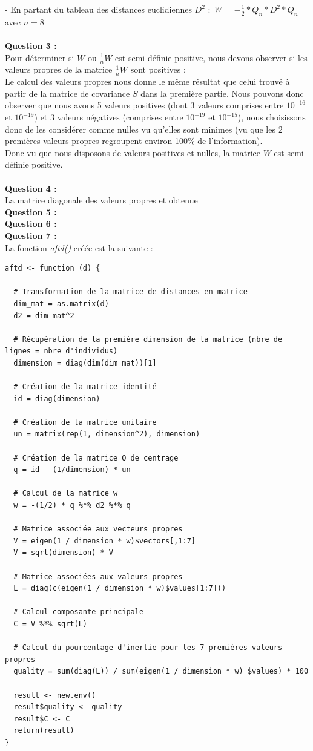 \documentclass[a4paper, 10pt]{article}
\begin{document}
- En partant du tableau des distances euclidiennes \textit{$D^{2}$} : \textit{W = $-\frac{1}{2} * Q_{n} * D^{2} * Q_{n}$} avec $n = 8$\\ \\
\textbf{Question 3 :}\\
Pour déterminer si $W$ ou $\frac{1}{n}W$ est semi-définie positive, nous devons observer si les valeurs propres de la matrice $\frac{1}{n}W$
sont positives :\\
Le calcul des valeurs propres nous donne le même résultat que celui trouvé à partir de la matrice de covariance $S$ dans la première partie.
Nous pouvons donc observer que nous avons 5 valeurs positives (dont 3 valeurs comprises entre $10^{-16}$ et $10^{-19}$) et
3 valeurs négatives (comprises entre $10^{-19}$ et $10^{-15}$), nous choisissons donc de les considérer comme nulles vu qu'elles sont minimes
(vu que les 2 premières valeurs propres regroupent environ 100\% de l'information).\\
Donc vu que nous disposons de valeurs positives et nulles, la matrice $W$ est semi-définie positive.\\ \\
\textbf{Question 4 :}\\
La matrice diagonale des valeurs propres et obtenue\\
\textbf{Question 5 :}\\
\textbf{Question 6 :}\\
\textbf{Question 7 :}\\
La fonction \textit{aftd()} créée est la suivante :
\begin{verbatim}
aftd <- function (d) {

  # Transformation de la matrice de distances en matrice
  dim_mat = as.matrix(d)
  d2 = dim_mat^2

  # Récupération de la première dimension de la matrice (nbre de lignes = nbre d'individus)
  dimension = diag(dim(dim_mat))[1]

  # Création de la matrice identité
  id = diag(dimension)

  # Création de la matrice unitaire
  un = matrix(rep(1, dimension^2), dimension)

  # Création de la matrice Q de centrage
  q = id - (1/dimension) * un

  # Calcul de la matrice w
  w = -(1/2) * q %*% d2 %*% q

  # Matrice associée aux vecteurs propres
  V = eigen(1 / dimension * w)$vectors[,1:7]
  V = sqrt(dimension) * V

  # Matrice associées aux valeurs propres
  L = diag(c(eigen(1 / dimension * w)$values[1:7]))

  # Calcul composante principale
  C = V %*% sqrt(L)

  # Calcul du pourcentage d'inertie pour les 7 premières valeurs propres
  quality = sum(diag(L)) / sum(eigen(1 / dimension * w) $values) * 100

  result <- new.env()
  result$quality <- quality
  result$C <- C
  return(result)
}

\end{verbatim}
\end{document}
